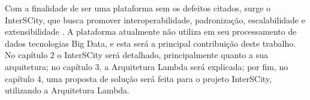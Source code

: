 Com a finalidade de ser uma plataforma sem os defeitos citados, surge o
InterSCity, que busca promover interoperabilidade, padronização, escalabilidade
e extensibilidade \cite{delesposte2017}. A plataforma atualmente não utiliza
em seu processamento de dados tecnologias Big Data, e esta será a principal
contribuição deste trabalho. No capítulo 2 o InterSCity será detalhado,
principalmente quanto a sua arquitetura; no capítulo 3, a Arquitetura Lambda
será explicada; por fim, no capítulo 4, uma proposta de solução será feita
para o projeto InterSCity, utilizando a Arquitetura Lambda.

